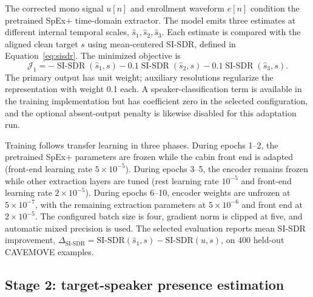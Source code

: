 The corrected mono signal $u[n]$ and enrollment waveform $e[n]$ condition the pretrained SpEx+ time-domain extractor. The model emits three estimates at different internal temporal scales, $\hat{s}_1,\hat{s}_2,\hat{s}_3$. Each estimate is compared with the aligned clean target $s$ using mean-centered SI-SDR, defined in Equation~\eqref{eq:sisdr}. The minimized objective is
\begin{equation}
  \mathcal{J}_1=-\operatorname{SI\text{-}SDR}(\hat{s}_1,s)
       -0.1\operatorname{SI\text{-}SDR}(\hat{s}_2,s)
       -0.1\operatorname{SI\text{-}SDR}(\hat{s}_3,s).
  \label{eq:method-stage1-loss}
\end{equation}
The primary output has unit weight; auxiliary resolutions regularize the representation with weight 0.1 each. A speaker-classification term is available in the training implementation but has coefficient zero in the selected configuration, and the optional absent-output penalty is likewise disabled for this adaptation run.

Training follows transfer learning in three phases. During epochs 1--2, the pretrained SpEx+ parameters are frozen while the cabin front end is adapted (front-end learning rate $5\times10^{-5}$). During epochs 3--5, the encoder remains frozen while other extraction layers are tuned (rest learning rate $10^{-5}$ and front-end learning rate $2\times10^{-5}$). During epochs 6--10, encoder weights are unfrozen at $5\times10^{-7}$, with the remaining extraction parameters at $5\times10^{-6}$ and front end at $2\times10^{-5}$. The configured batch size is four, gradient norm is clipped at five, and automatic mixed precision is used. The selected evaluation reports mean SI-SDR improvement, $\Delta_{\mathrm{SI\text{-}SDR}}=\mathrm{SI\text{-}SDR}(\hat{s}_1,s)-\mathrm{SI\text{-}SDR}(u,s)$, on 400 held-out CAVEMOVE examples.

\subsection{Stage 2: target-speaker presence estimation}
\label{subsec:method-stage2}

